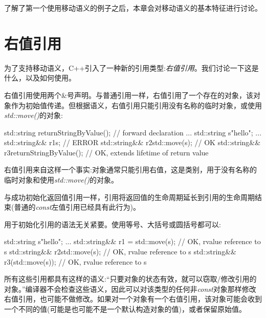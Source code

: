 
了解了第一个使用移动语义的例子之后，本章会对移动语义的基本特征进行讨论。\par


\section{右值引用}

为了支持移动语义，C++引入了一种新的引用类型:\textit{右值引用}。我们讨论一下这是什么，以及如何使用。\par


右值引用使用两个\&号声明。与普通引用一样，右值引用了一个存在的对象，该对象作为初始值传递。但根据语义，右值引用只能引用没有名称的临时对象，或使用\textit{std::move()}的对象:\par

\begin{codebox}[cpp]
std::string returnStringByValue(); // forward declaration
...
std::string s{"hello"};
...
std::string&& r1{s}; // ERROR
std::string&& r2{std::move(s)}; // OK
std::string&& r3{returnStringByValue()}; // OK, extends lifetime of return value
\end{codebox}

右值引用来自这样一个事实:对象通常只能引用右值，这是类别，用于没有名称的临时对象和使用\textit{std::move()}的对象。\par

与成功初始化返回值引用一样，引用将返回值的生命周期延长到引用的生命周期结束(普通的\textit{const}左值引用已经具有此行为)。\par

用于初始化引用的语法无关紧要。使用等号、大括号或圆括号都可以:\par

\begin{codebox}[cpp]
std::string s{"hello"};
...
std::string&& r1 = std::move(s); // OK, rvalue reference to s
std::string&& r2{std::move(s)}; // OK, rvalue reference to s
std::string&& r3(std::move(s)); // OK, rvalue reference to s
\end{codebox}

所有这些引用都具有这样的语义:“只要对象的状态有效，就可以窃取/修改引用的对象。”编译器不会检查这些语义，因此可以对该类型的任何非\textit{const}对象那样修改右值引用，也可能不做修改。如果对一个对象有一个右值引用，该对象可能会收到一个不同的值(可能是也可能不是一个默认构造对象的值)，或者保留原始值。\par

